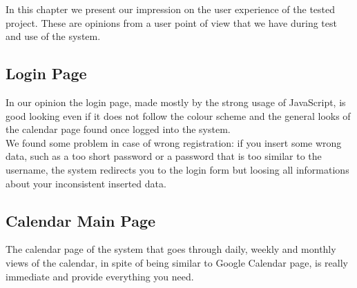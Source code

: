 In this chapter we present our impression on the user experience of the tested project. These are opinions from a user point of view that we have during test and use of the system.

\subsection{Login Page}
In our opinion the login page, made mostly by the strong usage of JavaScript, is good looking even if it does not follow the colour scheme and the general looks of the calendar page found once logged into the system. \\
We found some problem in case of wrong registration: if you insert some wrong data, such as a too short password or a password that is too similar to the username, the system redirects you to the login form but loosing all informations about your inconsistent inserted data.
\subsection{Calendar Main Page}
The calendar page of the system that goes through daily, weekly and monthly views of the calendar, in spite of being similar to Google Calendar page, is really immediate and provide everything you need. 